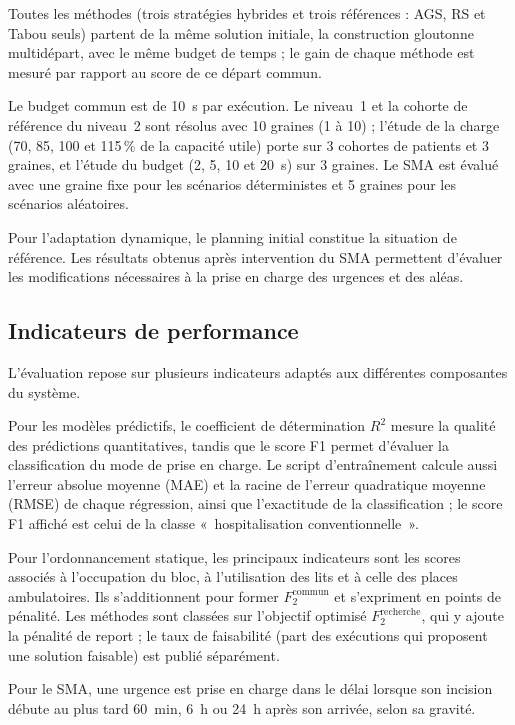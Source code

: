 \documentclass[11pt,a4paper]{article}
\begin{document}
Toutes les méthodes (trois stratégies hybrides et trois références : AGS, RS et Tabou seuls) partent de la même solution initiale, la construction gloutonne multidépart, avec le même budget de temps ; le gain de chaque méthode est mesuré par rapport au score de ce départ commun.

Le budget commun est de 10~s par exécution. Le niveau~1 et la cohorte de référence du niveau~2 sont résolus avec 10 graines (1 à 10) ; l'étude de la charge (70, 85, 100 et 115\,\% de la capacité utile) porte sur 3 cohortes de patients et 3 graines, et l'étude du budget (2, 5, 10 et 20~s) sur 3 graines. Le SMA est évalué avec une graine fixe pour les scénarios déterministes et 5 graines pour les scénarios aléatoires.

Pour l'adaptation dynamique, le planning initial constitue la situation de référence. Les résultats obtenus après intervention du SMA permettent d'évaluer les modifications nécessaires à la prise en charge des urgences et des aléas.

\subsection{Indicateurs de performance}

L'évaluation repose sur plusieurs indicateurs adaptés aux différentes composantes du système.

Pour les modèles prédictifs, le coefficient de détermination $R^2$ mesure la qualité des prédictions quantitatives, tandis que le score F1 permet d'évaluer la classification du mode de prise en charge. Le script d'entraînement calcule aussi l'erreur absolue moyenne (MAE) et la racine de l'erreur quadratique moyenne (RMSE) de chaque régression, ainsi que l'exactitude de la classification ; le score F1 affiché est celui de la classe «~hospitalisation conventionnelle~».

Pour l'ordonnancement statique, les principaux indicateurs sont les scores associés à l'occupation du bloc, à l'utilisation des lits et à celle des places ambulatoires. Ils s'additionnent pour former $F_2^{\mathrm{commun}}$ et s'expriment en points de pénalité. Les méthodes sont classées sur l'objectif optimisé $F_2^{\mathrm{recherche}}$, qui y ajoute la pénalité de report ; le taux de faisabilité (part des exécutions qui proposent une solution faisable) est publié séparément.

Pour le SMA, une urgence est prise en charge dans le délai lorsque son incision débute au plus tard 60~min, 6~h ou 24~h après son arrivée, selon sa gravité.
\end{document}
